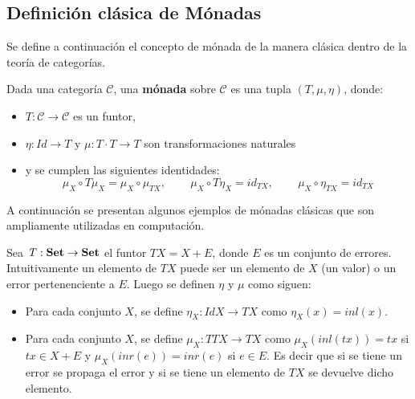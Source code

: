\subsection{Definición clásica de Mónadas}\label{monadas:usual}
Se define a continuación el concepto de mónada de la manera clásica dentro de la teoría de categorías.

\begin{definition}[Mónada]
Dada una categoría $\mathscr{C}$, una \textbf{mónada} sobre $\mathscr{C}$ es una tupla $(\mathit{T},\mu,\eta)$, donde:
\begin{itemize}[noitemsep,label=$\blacktriangleright$]
	\item $\mathit{T} : \mathscr{C} \rightarrow \mathscr{C}$ es un funtor,
	\item $\eta : \mathit{Id} \rightarrow \mathit{T}$ y $\mu : \mathit{T} \cdot \mathit{T} \rightarrow \mathit{T}$ son transformaciones naturales
	\item y se cumplen las siguientes identidades:
	\begin{equation*}
		\mu_X \circ \mathit{T}\mu_X = \mu_X \circ \mu_{\mathit{T}X} \text{, } \qquad \mu_X \circ \mathit{T}\eta_X = id_{\mathit{T}X} \text{, } \qquad 
		\mu_X \circ \eta_{\mathit{T}X} = id_{\mathit{T}X} 
	\end{equation*}
\end{itemize}
\end{definition}

A continuación se presentan algunos ejemplos de mónadas clásicas que son ampliamente utilizadas en computación.

\begin{ejemplo}
Sea $\mathit{T} : \text{\bf Set} \rightarrow \text{\bf Set}$ el funtor $\mathit{T} X = X + E$, donde $E$ es un conjunto de errores. Intuitivamente un elemento de $\mathit{T} X$ puede ser un elemento de $X$ (un valor) o un error pertenenciente a $E$. Luego se definen $\eta$ y $\mu$ como siguen:
\begin{itemize}[noitemsep, label=$\blacktriangleright$]
	\item Para cada conjunto $X$, se define $\eta_X : \mathit{Id} X \rightarrow \mathit{T} X$ como $\eta_X (x) = inl(x)$.
	\item Para cada conjunto $X$, se define $\mu_X : \mathit{T T} X \rightarrow \mathit{T} X$ como $\mu_X (inl(tx)) = tx$ si $tx \in X + E$ y $\mu_X (inr(e)) = inr(e)$ si $e \in E$. Es decir que si se tiene un error se propaga el error y si se tiene un elemento de $\mathit{T} X$ se devuelve dicho elemento. 
\end{itemize}
\end{ejemplo}

